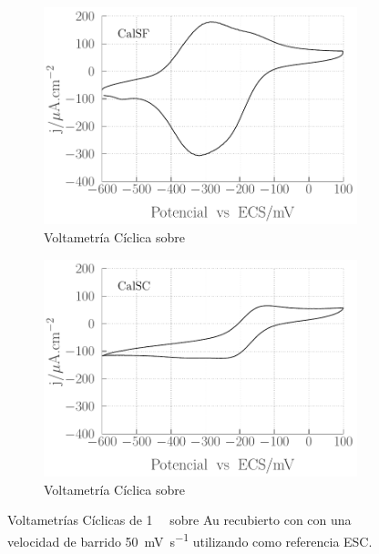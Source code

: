 						\begin{figure}[th]
				 	   	    \begin{subfigure}[t]{0.495\textwidth}
				        	\includegraphics[width=\textwidth]{Graficos/SF-accesibilidad.pdf}
				       		\caption{Voltametría Cíclica sobre \pdmF}
				         	\end{subfigure}
				         	\begin{subfigure}[t]{0.495\textwidth}
				        	\includegraphics[width=\textwidth]{Graficos/SC-accesibilidad.pdf}
				       		\caption{Voltametría Cíclica sobre \pdmC}
				         	\end{subfigure}
				     		\caption[Accesibilidad electrodo de trabajo.]{Voltametrías Cíclicas de \aminorutenio\space \SI{1}{\milli\Molar} sobre Au recubierto con \pdm\space con una velocidad de barrido \SI{50}{\milli\volt\per\second} utilizando como referencia ESC.}
				     		\label{fig:accesibilidad}
				     		\end{figure}
	
